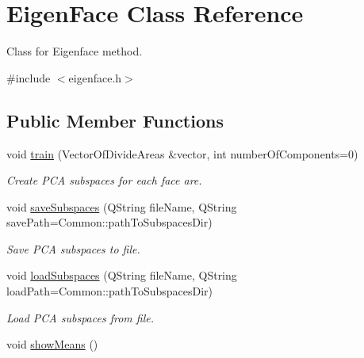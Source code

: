\hypertarget{class_eigen_face}{\section{Eigen\+Face Class Reference}
\label{class_eigen_face}
}


Class for Eigenface method.  




{\ttfamily \#include $<$eigenface.\+h$>$}

\subsection*{Public Member Functions}
\begin{DoxyCompactItemize}
\item 
void \hyperlink{class_eigen_face_a11b9853a6f6406ad967bff2cea9c25d3}{train} (Vector\+Of\+Divide\+Areas \&vector, int number\+Of\+Components=0)
\begin{DoxyCompactList}\small\item\em Create P\+C\+A subspaces for each face are. \end{DoxyCompactList}\item 
void \hyperlink{class_eigen_face_a202e85c56b51ffd4d239eb39a3933985}{save\+Subspaces} (Q\+String file\+Name, Q\+String save\+Path=Common\+::path\+To\+Subspaces\+Dir)
\begin{DoxyCompactList}\small\item\em Save P\+C\+A subspaces to file. \end{DoxyCompactList}\item 
void \hyperlink{class_eigen_face_a3b755baac3a15247fe20541e2baee864}{load\+Subspaces} (Q\+String file\+Name, Q\+String load\+Path=Common\+::path\+To\+Subspaces\+Dir)
\begin{DoxyCompactList}\small\item\em Load P\+C\+A subspaces from file. \end{DoxyCompactList}\item 
\hypertarget{class_eigen_face_ad3fd8ed994fc0ed3f94d641dd2f10bb2}{void \hyperlink{class_eigen_face_ad3fd8ed994fc0ed3f94d641dd2f10bb2}{show\+Means} ()}\label{class_eigen_face_ad3fd8ed994fc0ed3f94d641dd2f10bb2}


\end{DoxyCompactItemize}
